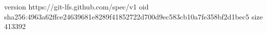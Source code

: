 version https://git-lfs.github.com/spec/v1
oid sha256:4963a62ffce24639681e8289f41852722d700d9ec583cb10a7fe358bf2d1bec5
size 413392
